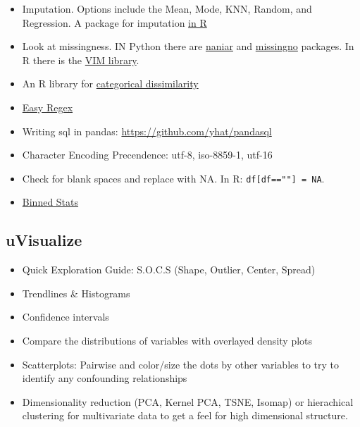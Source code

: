 \documentclass[]{book}
\theoremstyle{definition}
\theoremstyle{definition}
\theoremstyle{definition}
\theoremstyle{remark}
\begin{document}
\begin{itemize}
\item
  Imputation. Options include the Mean, Mode, KNN, Random, and
  Regression. A package for imputation
  \href{https://cran.r-project.org/web/packages/simputation/index.html}{in
  R}
\item
  Look at missingness. IN Python there are
  \href{https://github.com/njtierney/naniar}{naniar} and
  \href{https://github.com/ResidentMario/missingno}{missingno} packages.
  In R there is the
  \href{https://rstudio-pubs-static.s3.amazonaws.com/4625_fa990d611f024ea69e7e2b10dd228fe7.html}{VIM
  library}.
\item
  An R library for
  \href{https://www.rdocumentation.org/packages/StatMatch/versions/1.2.5/topics/gower.dist}{categorical
  dissimilarity}
\item
  \href{https://github.com/VerbalExpressions/PythonVerbalExpressions}{Easy
  Regex}
\item
  Writing sql in pandas: \url{https://github.com/yhat/pandasql}
\item
  Character Encoding Precendence: utf-8, iso-8859-1, utf-16
\item
  Check for blank spaces and replace with NA. In R:
  \texttt{df{[}df==""{]}\ =\ NA}.
\item
  \href{https://docs.scipy.org/doc/scipy-0.16.0/reference/generated/scipy.stats.binned_statistic.html}{Binned
  Stats}
\end{itemize}

\subsection{uVisualize}\label{uvisualize}

\begin{itemize}
\item
  Quick Exploration Guide: S.O.C.S (Shape, Outlier, Center, Spread)
\item
  Trendlines \& Histograms
\item
  Confidence intervals
\item
  Compare the distributions of variables with overlayed density plots
\item
  Scatterplots: Pairwise and color/size the dots by other variables to
  try to identify any confounding relationships
\item
  Dimensionality reduction (PCA, Kernel PCA, TSNE, Isomap) or
  hierachical clustering for multivariate data to get a feel for high
  dimensional structure.
\end{itemize}
\end{document}
